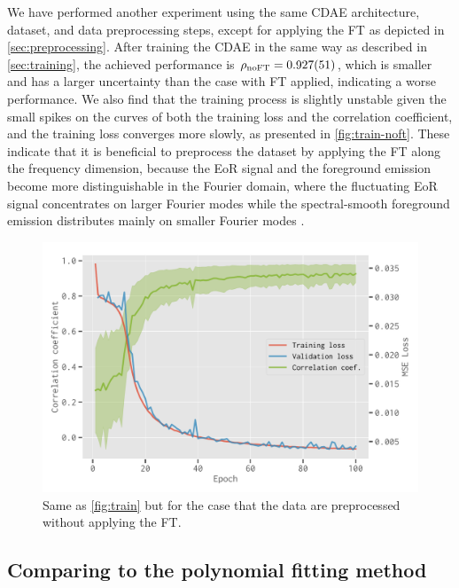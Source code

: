 \documentclass[fleqn,usenatbib]{mnras}
\newlength{\myfigwidth}
\newcommand{\R}[1]{\mathrm{#1}}
\begin{document}
We have performed another experiment using the same CDAE architecture,
dataset, and data preprocessing steps, except for applying the FT
as depicted in \autoref{sec:preprocessing}.
After training the CDAE in the same way as described in
\autoref{sec:training}, the achieved performance is
$\rho_{\R{noFT}} = \num{0.927 +- 0.051}$, which is smaller and has a
larger uncertainty than the case with FT applied, indicating a worse
performance.
We also find that the training process is slightly unstable given the
small spikes on the curves of both the training loss and the correlation
coefficient, and the training loss converges more slowly,
as presented in \autoref{fig:train-noft}.
These indicate that it is beneficial to preprocess the
dataset by applying the FT along the frequency dimension, because the
EoR signal and the foreground emission become more distinguishable
in the Fourier domain, where the fluctuating EoR signal concentrates on
larger Fourier modes while the spectral-smooth foreground emission
distributes mainly on smaller Fourier modes \citep[e.g.,][]{parsons2012}.

\begin{figure}
  \centering
  \includegraphics[width=\myfigwidth]{cdae-train-noft}
  \caption{\label{fig:train-noft}%
    Same as \autoref{fig:train} but for the case that the data are
    preprocessed without applying the FT.
  }
\end{figure}


\subsection{Comparing to the polynomial fitting method}
\label{sec:polyfit}
\end{document}
